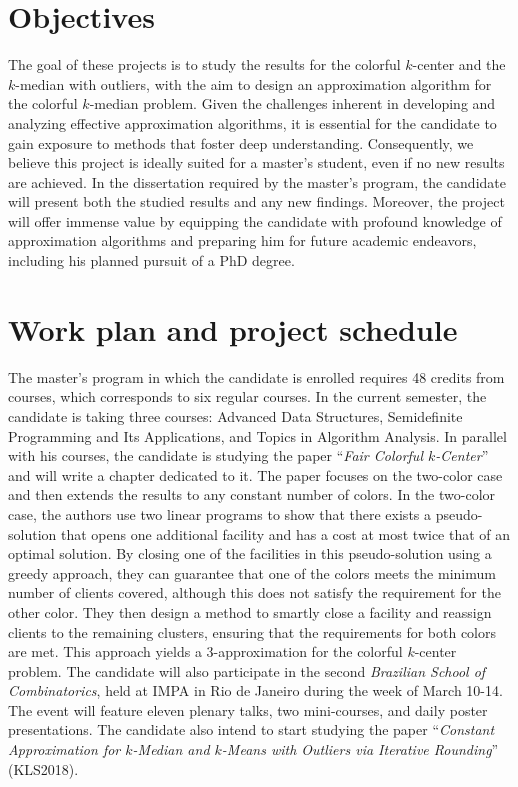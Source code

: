 \documentclass[12pt]{article}
\begin{document}
\section{Objectives}

The goal of these projects is to study the results for the colorful $k$-center and the $k$-median with outliers, with the aim to design an approximation algorithm for the colorful $k$-median problem.
Given the challenges inherent in developing and analyzing effective approximation algorithms, it is essential for the candidate to gain exposure to methods that foster deep understanding. 
Consequently, we believe this project is ideally suited for a master's student, even if no new results are achieved. 
In the dissertation required by the master's program, the candidate will present both the studied results and any new findings.
Moreover, the project will offer immense value by equipping the candidate with profound knowledge of approximation algorithms and preparing him for future academic endeavors, including his planned pursuit of a PhD degree.

\section{Work plan and project schedule}
The master's program in which the candidate is enrolled requires 48 credits from courses, which corresponds to six regular courses. 
In the current semester, the candidate is taking three courses: Advanced Data Structures, Semidefinite Programming and Its Applications, and Topics in Algorithm Analysis. 
In parallel with his courses, the candidate is studying the paper ``\emph{Fair Colorful $k$-Center}''~\cite{JSS2020} and will write a chapter dedicated to it. 
The paper focuses on the two-color case and then extends the results to any constant number of colors. 
In the two-color case, the authors use two linear programs to show that there exists a pseudo-solution that opens one additional facility and has a cost at most twice that of an optimal solution. 
By closing one of the facilities in this pseudo-solution using a greedy approach, they can guarantee that one of the colors meets the minimum number of clients covered, although this does not satisfy the requirement for the other color. 
They then design a method to smartly close a facility and reassign clients to the remaining clusters, ensuring that the requirements for both colors are met. 
This approach yields a 3-approximation for the colorful $k$-center problem.
The candidate will also participate in the second \emph{Brazilian School of Combinatorics}, held at IMPA in Rio de Janeiro during the week of March 10-14. 
The event will feature eleven plenary talks, two mini-courses, and daily poster presentations. 
The candidate also intend to start studying the paper ``\emph{Constant Approximation for $k$-Median and $k$-Means with Outliers
via Iterative Rounding}''~\cite{KLS2018} (KLS2018).
\end{document}
